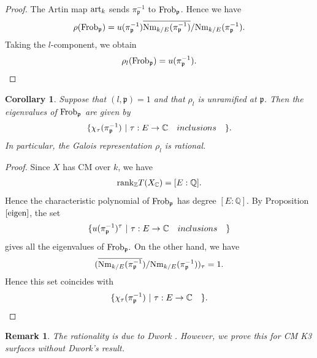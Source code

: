 \documentclass[reqno,a4paper,11pt]{amsart}
\newtheorem{cor}[dfn]{Corollary}
\newtheorem{rmk}[dfn]{Remark}
\theoremstyle{definition}
\theoremstyle{definition}
\begin{document}
  \begin{proof}
      The Artin map ${\rm art}_{k}$ sends $\pi_{\mathfrak{p}}^{-1}$ to ${\rm Frob}_{\mathfrak{p}}$. Hence we have 
      \begin{align}
          \rho({\rm Frob}_{\mathfrak{p}})=u(\pi_{\mathfrak{p}}^{-1})\overline{{\rm Nm}_{k/E}(\pi_{\mathfrak{p}}^{-1})}/{\rm Nm}_{k/E}(\pi_{\mathfrak{p}}^{-1}).\notag
      \end{align}
      Taking the $l$-component, we obtain 
      \begin{align}
          \rho_{l}({\rm Frob}_{\mathfrak{p}})=u(\pi_{\mathfrak{p}}^{-1})\notag.
      \end{align}
  \end{proof}
  \begin{cor}\label{eigen2}
  Suppose that $(l, \mathfrak{p})=1$ and that $\rho_{l}$ is unramified at $\mathfrak{p}$. Then the eigenvalues of ${\rm Frob}_{\mathfrak{p}}$ are given by
      \begin{align}
      \{\chi_{\tau}(\pi_{\mathfrak{p}}^{-1})~ |~ \tau : E\to \mathbb{C}~~~inclusions~~~\}.\notag
      \end{align}
      In particular, the Galois representation $\rho_{l}$ is rational.
  \end{cor}
  \begin{proof}
      Since $X$ has CM over $k$, we have 
      \begin{align}
    {\rm rank}_{\mathbb{Z}}T(X_{\mathbb{C}})=[E:\mathbb{Q}]. \notag
      \end{align}
      Hence the characteristic polynomial of ${\rm Frob}_{\mathfrak{p}}$ has  degree $[E : \mathbb{Q}].$ By Proposition  $\ref{eigen}$, the set 
      \begin{align}
          \{u(\pi_{\frak{p}}^{-1})^{\tau}~|~\tau : E\to \mathbb{C} ~~~inclusions~~~\}\notag
      \end{align}
      gives all  the eigenvalues of ${\rm Frob}_{\mathfrak{p}}.$ On the other hand, we have 
      \begin{align}(\overline{{\rm Nm}_{k/E}(\pi_{\mathfrak{p}}^{-1}})/{\rm Nm}_{k/E}(\pi_{\mathfrak{p}}^{-1}))_{\tau}=1.\notag
      \end{align}
      Hence this set coincides with 
      \begin{align}
          \{ \chi_{\tau}(\pi_{\mathfrak{p}}^{-1})~|~ \tau:E\to \mathbb{C}~~~\}\notag.
      \end{align}
  \end{proof}
  \begin{rmk}
      The rationality is due to Dwork \cite{dw}. However, we prove this  for CM K3 surfaces without Dwork's result.
  \end{rmk}
\end{document}
